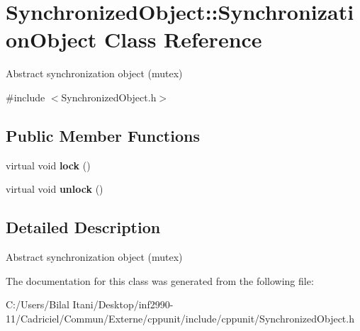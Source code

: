 \hypertarget{class_synchronized_object_1_1_synchronization_object}{}\section{Synchronized\+Object\+:\+:Synchronization\+Object Class Reference}
\label{class_synchronized_object_1_1_synchronization_object}


Abstract synchronization object (mutex)  




{\ttfamily \#include $<$Synchronized\+Object.\+h$>$}

\subsection*{Public Member Functions}
\begin{DoxyCompactItemize}
\item 
virtual void {\bfseries lock} ()\hypertarget{class_synchronized_object_1_1_synchronization_object_a2c1a4b7e3e3a8f8993140fb1fc9dabe0}{}\label{class_synchronized_object_1_1_synchronization_object_a2c1a4b7e3e3a8f8993140fb1fc9dabe0}

\item 
virtual void {\bfseries unlock} ()\hypertarget{class_synchronized_object_1_1_synchronization_object_a2af2a59901a0cdc673dc8729840fe797}{}\label{class_synchronized_object_1_1_synchronization_object_a2af2a59901a0cdc673dc8729840fe797}

\end{DoxyCompactItemize}


\subsection{Detailed Description}
Abstract synchronization object (mutex) 

The documentation for this class was generated from the following file\+:\begin{DoxyCompactItemize}
\item 
C\+:/\+Users/\+Bilal Itani/\+Desktop/inf2990-\/11/\+Cadriciel/\+Commun/\+Externe/cppunit/include/cppunit/Synchronized\+Object.\+h\end{DoxyCompactItemize}
